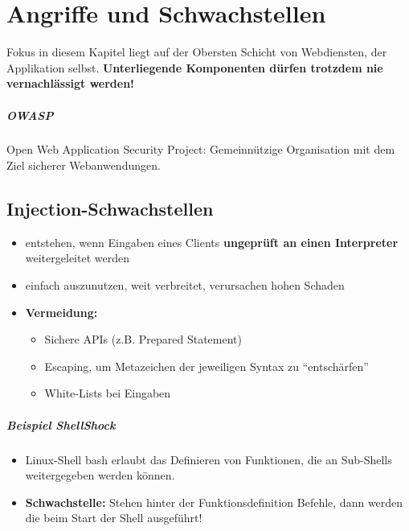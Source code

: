 \chapter{Angriffe und Schwachstellen}
Fokus in diesem Kapitel liegt auf der Obersten Schicht von Webdiensten, der Applikation selbst.
\textbf{Unterliegende Komponenten dürfen trotzdem nie vernachlässigt werden!}

\paragraph{OWASP}
Open Web Application Security Project: Gemeinnützige Organisation mit dem Ziel sicherer Webanwendungen.

\section{Injection-Schwachstellen}
\begin{itemize}
	\item entstehen, wenn Eingaben eines Clients \textbf{ungeprüft an einen Interpreter} weitergeleitet werden
	\item einfach auszunutzen, weit verbreitet, verursachen hohen Schaden
	\item \textbf{Vermeidung:} 
	\begin{itemize}
	\item Sichere APIs (z.B. Prepared Statement)
	\item Escaping, um Metazeichen der jeweiligen Syntax zu \enquote{entschärfen}
	\item White-Lists bei Eingaben
	\end{itemize}
\end{itemize}

\paragraph{Beispiel ShellShock}
\begin{itemize}
	\item Linux-Shell bash erlaubt das Definieren von Funktionen, die an Sub-Shells weitergegeben werden können. 
	\item \textbf{Schwachstelle:} Stehen hinter der Funktionsdefinition Befehle, dann werden die beim Start der Shell ausgeführt!
\end{itemize}